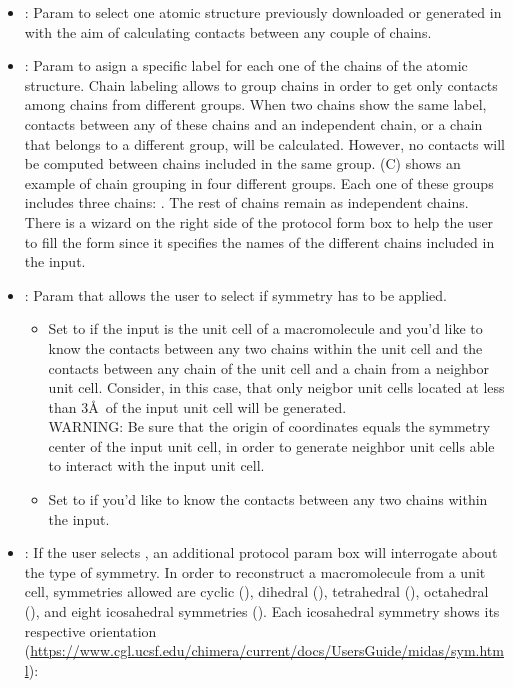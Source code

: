 \begin{itemize}
    \begin{itemize}
     \item {}: Param to select one atomic structure previously downloaded or generated in \scipion with the aim of calculating contacts between any couple of chains.
     \item {}: Param to asign a specific label for each one of the chains of the atomic structure. Chain labeling allows to group chains in order to get only contacts among chains from different groups. When two chains show the same label, contacts between any of these chains and an independent chain, or a chain that belongs to a different group, will be calculated. However, no contacts will be computed between chains included in the same group.  (C) shows an example of chain grouping in four different groups. Each one of these groups includes three chains: . The rest of chains remain as independent chains. There is a wizard on the right side of the  protocol form box to help the user to fill the form since it specifies the names of the different chains included in the  input. 
     \item {}: Param that allows the user to select if symmetry has to be applied.
        \begin{itemize}
        \item Set to  if the  input is the unit cell of a macromolecule and you'd like to know the contacts between any two chains within the unit cell and the contacts between any chain of the unit cell and a chain from a neighbor unit cell. Consider, in this case, that only neigbor unit cells located at less than 3\AA\ of the input unit cell will be generated.\\
        WARNING: Be sure that the origin of coordinates equals the symmetry center of the input unit cell, in order to generate neighbor unit cells able to interact with the input unit cell.
        \item Set to  if you'd like to know the contacts between any two chains within the  input. 
        \end{itemize}
     \item {}: If the user selects , an additional protocol param box will interrogate about the type of symmetry. In order to reconstruct a macromolecule from a unit cell, symmetries allowed are cyclic (), dihedral (), tetrahedral (), octahedral (), and eight icosahedral symmetries (). Each icosahedral symmetry shows its respective \chimera orientation (\url{https://www.cgl.ucsf.edu/chimera/current/docs/UsersGuide/midas/sym.html}):

\end{itemize}
\end{itemize}
